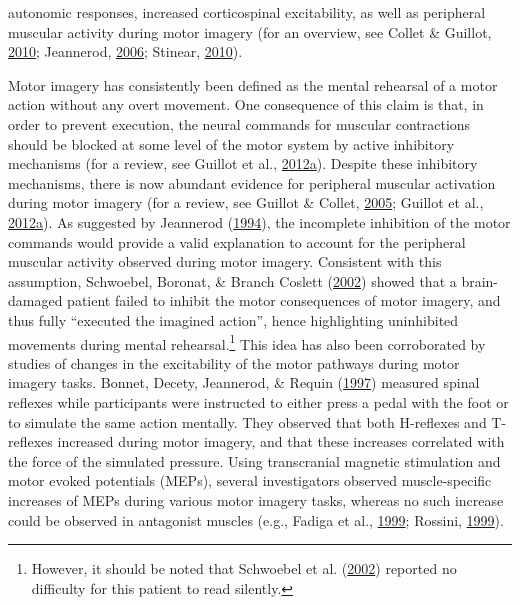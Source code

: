 \documentclass[a4paper,12pt,twoside,onecolumn,openright,final,oldfontcommands]{memoir}
\let\rmarkdownfootnote\footnote%
\def\footnote{\protect\rmarkdownfootnote}
\begin{document}
autonomic responses, increased corticospinal excitability, as well as peripheral muscular activity during motor imagery (for an overview, see Collet \& Guillot, \protect\hyperlink{ref-collet_autonomic_2010}{2010}; Jeannerod, \protect\hyperlink{ref-jeannerod_motor_2006}{2006}; Stinear, \protect\hyperlink{ref-stinear_corticospinal_2010}{2010}).

Motor imagery has consistently been defined as the mental rehearsal of a motor action without any overt movement. One consequence of this claim is that, in order to prevent execution, the neural commands for muscular contractions should be blocked at some level of the motor system by active inhibitory mechanisms (for a review, see Guillot et al., \protect\hyperlink{ref-guillot_imagining_2012}{2012}\protect\hyperlink{ref-guillot_imagining_2012}{a}). Despite these inhibitory mechanisms, there is now abundant evidence for peripheral muscular activation during motor imagery (for a review, see Guillot \& Collet, \protect\hyperlink{ref-guillot_contribution_2005}{2005}; Guillot et al., \protect\hyperlink{ref-guillot_imagining_2012}{2012}\protect\hyperlink{ref-guillot_imagining_2012}{a}). As suggested by Jeannerod (\protect\hyperlink{ref-jeannerod_representing_1994}{1994}), the incomplete inhibition of the motor commands would provide a valid explanation to account for the peripheral muscular activity observed during motor imagery. Consistent with this assumption, Schwoebel, Boronat, \& Branch Coslett (\protect\hyperlink{ref-schwoebel_man_2002}{2002}) showed that a brain-damaged patient failed to inhibit the motor consequences of motor imagery, and thus fully \enquote{executed the imagined action}, hence highlighting uninhibited movements during mental rehearsal.\footnote{However, it should be noted that Schwoebel et al. (\protect\hyperlink{ref-schwoebel_man_2002}{2002}) reported no difficulty for this patient to read silently.} This idea has also been corroborated by studies of changes in the excitability of the motor pathways during motor imagery tasks. Bonnet, Decety, Jeannerod, \& Requin (\protect\hyperlink{ref-bonnet_mental_1997}{1997}) measured spinal reflexes while participants were instructed to either press a pedal with the foot or to simulate the same action mentally. They observed that both H-reflexes and T-reflexes increased during motor imagery, and that these increases correlated with the force of the simulated pressure. Using transcranial magnetic stimulation and motor evoked potentials (MEPs), several investigators observed muscle-specific increases of MEPs during various motor imagery tasks, whereas no such increase could be observed in antagonist muscles (e.g., Fadiga et al., \protect\hyperlink{ref-fadiga_corticospinal_1999}{1999}; Rossini, \protect\hyperlink{ref-rossini_corticospinal_1999}{1999}).
\end{document}
